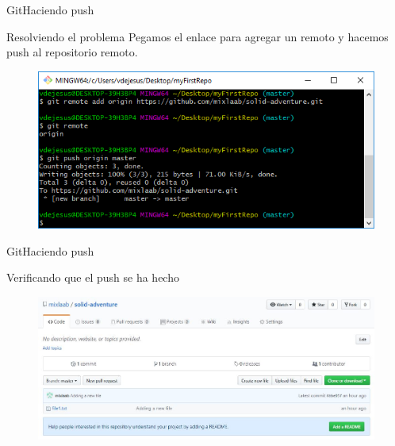 \documentclass[10pt]{beamer}
\begin{document}
\begin{frame}{Git}{Haciendo push}

\begin{block}{Resolviendo el problema}
Pegamos el enlace para agregar un remoto y hacemos push al repositorio remoto.

\begin{figure}[h!]
\centering
\includegraphics [scale=0.5]{step7}
\label{fig:gitstatus}
\end{figure}

\end{block}

\end{frame}

\begin{frame}{Git}{Haciendo push}

\begin{block}{Verificando que el push se ha hecho}

\begin{figure}[h!]
\centering
\includegraphics [scale=0.35]{step8}
\label{fig:gitstatus}
\end{figure}

\end{block}

\end{frame}
\end{document}
